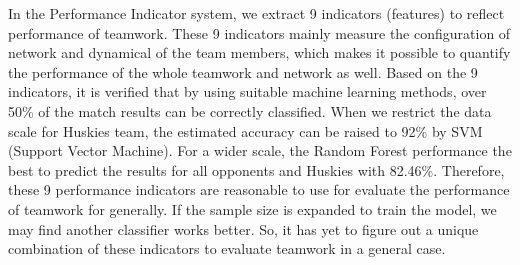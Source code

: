 \documentclass{mcmthesis}
\begin{document}
In the Performance Indicator system, we extract 9 indicators (features) to reflect performance of teamwork. These 9 indicators mainly measure the configuration of network and dynamical of the team members, which makes it possible to quantify the performance of the whole teamwork and network as well. Based on the 9 indicators, it is verified that by using suitable machine learning methods, over 50\% of the match results can be correctly classified. When we restrict the data scale for Huskies team, the estimated accuracy can be raised to 92\% by SVM (Support Vector Machine). For a wider scale, the Random Forest performance the best to predict the results for all opponents and Huskies with 82.46\%. Therefore, these 9 performance indicators are reasonable to use for evaluate the performance of teamwork for generally. If the sample size is expanded to train the model, we may find another classifier works better. So, it has yet to figure out a unique combination of these indicators to evaluate teamwork in a general case.
\end{document}
